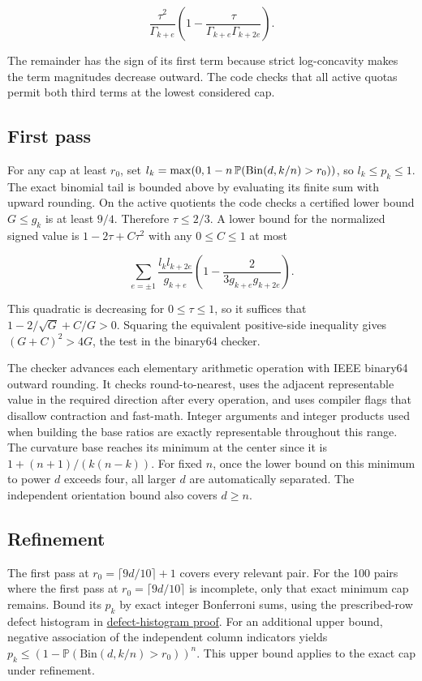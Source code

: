 \documentclass[11pt]{article}
\begin{document}
\begin{equation*}
\frac{\tau^2}{\Gamma_{k+e}}
\left(1-\frac{\tau}{\Gamma_{k+e}\Gamma_{k+2e}}\right).
\end{equation*}

The remainder has the sign of its first term because strict log-concavity makes the term magnitudes decrease outward. The code checks that all active quotas permit both third terms at the lowest considered cap.

\subsection{First pass}

For any cap at least $r_0$, set $l_k=\max(0,1-n\thinspace \mathbb P(\mathrm{Bin}(d,k/n)>r_0))$, so $l_k\le p_k\le1$. The exact binomial tail is bounded above by evaluating its finite sum with upward rounding. On the active quotients the code checks a certified lower bound $G\le g_k$ is at least $9/4$. Therefore $\tau\le2/3$. A lower bound for the normalized signed value is $1-2\tau+C\tau^2$ with any $0\le C\le1$ at most

\begin{equation*}
\sum_{e=\pm1}
\frac{l_k l_{k+2e}}{g_{k+e}}
\left(1-\frac{2}{3g_{k+e}g_{k+2e}}\right).
\end{equation*}

This quadratic is decreasing for $0\le\tau\le1$, so it suffices that $1-2/\sqrt G+C/G>0$. Squaring the equivalent positive-side inequality gives $(G+C)^2>4G$, the test in the binary64 checker.

The checker advances each elementary arithmetic operation with IEEE binary64 outward rounding. It checks round-to-nearest, uses the adjacent representable value in the required direction after every operation, and uses compiler flags that disallow contraction and fast-math. Integer arguments and integer products used when building the base ratios are exactly representable throughout this range. The curvature base reaches its minimum at the center since it is $1+(n+1)/(k(n-k))$. For fixed $n$, once the lower bound on this minimum to power $d$ exceeds four, all larger $d$ are automatically separated. The independent orientation bound also covers $d\ge n$.

\subsection{Refinement}

The first pass at $r_0=\lceil9d/10\rceil+1$ covers every relevant pair. For the 100 pairs where the first pass at $r_0=\lceil9d/10\rceil$ is incomplete, only that exact minimum cap remains. Bound its $p_k$ by exact integer Bonferroni sums, using the prescribed-row defect histogram in \href{https://github.com/ProgramComputer/open-math-research/blob/114696f2f69429411c6cd4f11955aee963d5320d/topics/balanced-arrays/curvature-compensation/defect-histogram.md}{defect-histogram proof}. For an additional upper bound, negative association of the independent column indicators yields $p_k\le(1-\mathbb P(\mathrm{Bin}(d,k/n)>r_0))^n$. This upper bound applies to the exact cap under refinement.
\end{document}
